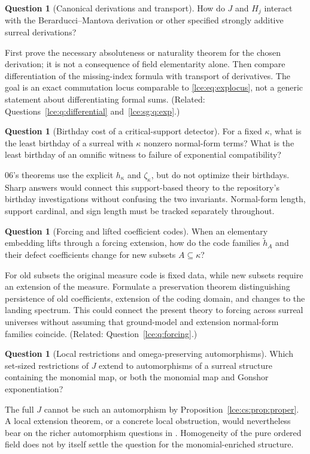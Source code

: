 \documentclass[11pt,letterpaper]{article}
\numberwithin{equation}{section}
\theoremstyle{definition}
\newtheorem{question}[theorem]{Question}
\theoremstyle{remark}
\newcommand{\prref}[1]{Proposition~\ref{#1}}
\begin{document}
\begin{question}[Canonical derivations and transport]\label{lce:cs:q:derivations}
How do $J$ and $H_j$ interact with the Berarducci--Mantova derivation or
other specified strongly additive surreal derivations?
\end{question}
First prove the necessary absoluteness or naturality theorem for the chosen
derivation; it is not a consequence of field elementarity alone. Then
compare differentiation of the missing-index formula with transport of
derivatives. The goal is an exact commutation locus comparable to
\eqref{lce:eq:explocus}, not a generic statement about differentiating
formal sums. (Related: Questions~\ref{lce:q:differential}
and~\ref{lce:sg:q:exp}.)

\begin{question}[Birthday cost of a critical-support detector]\label{lce:cs:q:birthday}
For a fixed $\kappa$, what is the least birthday of a surreal with $\kappa$
nonzero normal-form terms? What is the least birthday of an omnific witness
to failure of exponential compatibility?
\end{question}
06's theorems use the explicit $h_\kappa$ and $\zeta_\kappa$, but do not
optimize their birthdays. Sharp answers would connect this support-based
theory to the repository's birthday investigations without confusing the
two invariants. Normal-form length, support cardinal, and sign length must
be tracked separately throughout.

\begin{question}[Forcing and lifted coefficient codes]\label{lce:cs:q:forcing}
When an elementary embedding lifts through a forcing extension, how do the
code families $\tilde h_A$ and their defect coefficients change for new
subsets $A\subseteq\kappa$?
\end{question}
For old subsets the original measure code is fixed data, while new subsets
require an extension of the measure. Formulate a preservation theorem
distinguishing persistence of old coefficients, extension of the coding
domain, and changes to the landing spectrum. This could connect the present
theory to forcing across surreal universes without assuming that
ground-model and extension normal-form families coincide. (Related:
Question~\ref{lce:q:forcing}.)

\begin{question}[Local restrictions and omega-preserving automorphisms]
\label{lce:cs:q:local}
Which set-sized restrictions of $J$ extend to automorphisms of a surreal
structure containing the monomial map, or both the monomial map and Gonshor
exponentiation?
\end{question}
The full $J$ cannot be such an automorphism by \prref{lce:cs:prop:proper}. A
local extension theorem, or a concrete local obstruction, would nevertheless
bear on the richer automorphism questions in \cite{KKS}. Homogeneity of the
pure ordered field does not by itself settle the question for the
monomial-enriched structure.
\end{document}
